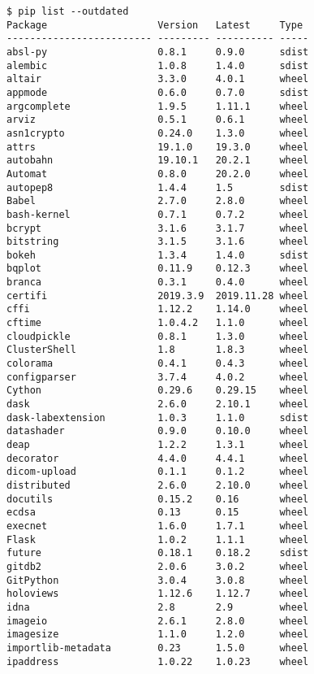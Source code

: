 \documentclass[11pt,a4paper]{article}
\begin{document}
\begin{verbatim}
$ pip list --outdated
Package                   Version   Latest     Type
------------------------- --------- ---------- -----
absl-py                   0.8.1     0.9.0      sdist
alembic                   1.0.8     1.4.0      sdist
altair                    3.3.0     4.0.1      wheel
appmode                   0.6.0     0.7.0      sdist
argcomplete               1.9.5     1.11.1     wheel
arviz                     0.5.1     0.6.1      wheel
asn1crypto                0.24.0    1.3.0      wheel
attrs                     19.1.0    19.3.0     wheel
autobahn                  19.10.1   20.2.1     wheel
Automat                   0.8.0     20.2.0     wheel
autopep8                  1.4.4     1.5        sdist
Babel                     2.7.0     2.8.0      wheel
bash-kernel               0.7.1     0.7.2      wheel
bcrypt                    3.1.6     3.1.7      wheel
bitstring                 3.1.5     3.1.6      wheel
bokeh                     1.3.4     1.4.0      sdist
bqplot                    0.11.9    0.12.3     wheel
branca                    0.3.1     0.4.0      wheel
certifi                   2019.3.9  2019.11.28 wheel
cffi                      1.12.2    1.14.0     wheel
cftime                    1.0.4.2   1.1.0      wheel
cloudpickle               0.8.1     1.3.0      wheel
ClusterShell              1.8       1.8.3      wheel
colorama                  0.4.1     0.4.3      wheel
configparser              3.7.4     4.0.2      wheel
Cython                    0.29.6    0.29.15    wheel
dask                      2.6.0     2.10.1     wheel
dask-labextension         1.0.3     1.1.0      sdist
datashader                0.9.0     0.10.0     wheel
deap                      1.2.2     1.3.1      wheel
decorator                 4.4.0     4.4.1      wheel
dicom-upload              0.1.1     0.1.2      wheel
distributed               2.6.0     2.10.0     wheel
docutils                  0.15.2    0.16       wheel
ecdsa                     0.13      0.15       wheel
execnet                   1.6.0     1.7.1      wheel
Flask                     1.0.2     1.1.1      wheel
future                    0.18.1    0.18.2     sdist
gitdb2                    2.0.6     3.0.2      wheel
GitPython                 3.0.4     3.0.8      wheel
holoviews                 1.12.6    1.12.7     wheel
idna                      2.8       2.9        wheel
imageio                   2.6.1     2.8.0      wheel
imagesize                 1.1.0     1.2.0      wheel
importlib-metadata        0.23      1.5.0      wheel
ipaddress                 1.0.22    1.0.23     wheel

\end{verbatim}
\end{document}
